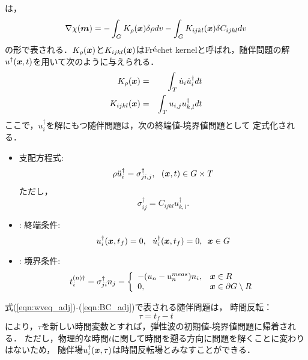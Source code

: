 は，
\begin{equation}
	\nabla \chi(\boldsymbol{m}) = 
	-\int_G K_{\rho}(\boldsymbol{x})\delta \rho dv
	- 
	\int_G K_{ijkl}(\boldsymbol{x}) \delta C_{ijkl} dv
	\label{eqn:}
\end{equation}
の形で表される．$K_\rho(\boldsymbol{x})$と$K_{ijkl}(\boldsymbol{x})$はFr$\acute{\rm e}$chet 
kernelと呼ばれ，随伴問題の解$u^{\dagger}(\boldsymbol{x},t)$を用いて次のように与えられる\cite{Fichtner}．
\begin{eqnarray}
	K_\rho(\boldsymbol{x}) &= & \int _T \dot{u}_i \dot{u}^{\dagger}_i dt 
	\label{eqn:K_rho}
	\\
	K_{ijkl}(\boldsymbol{x}) &= & \int _T u_{i,j} u^{\dagger}_{k,l} dt 
	\label{eqn:K_ijkl}
\end{eqnarray}
ここで，$u_i^{\dagger}$を解にもつ随伴問題は，次の終端値-境界値問題として
定式化される．
\begin{itemize}
\item
支配方程式:
\begin{equation}
	\rho \ddot{u}_i^{\dagger} =
	\sigma^{\dagger}_{ji,j}, \ \ 
	(\fat{x},t) \in G\times T
	\label{eqn:wveq_adj}
\end{equation}
ただし，
\begin{equation}
	\sigma_{ij}^{\dagger}= C_{ijkl}u_{k,l}^{\dagger}.
	\label{eqn:sigma_dgg}
\end{equation}
\item: 
終端条件:
\begin{equation}
	u_i^{\dagger}(\boldsymbol{x},t_f) =0,  \ \
	\dot{u}_i^{\dagger}(\boldsymbol{x},t_f) =0,  \ \, \boldsymbol{x}\in G
	\label{eqn:IC_adj}
\end{equation}
\item:
境界条件:
\begin{equation}
	t_i^{(n)\dagger}
	=
	\sigma_{ji}^{\dagger}n_j =
	\left\{
		\begin{array}{ll}
			-(u_n-u_n^{meas})n_i, & \boldsymbol{x}\in R \\
			0, & \boldsymbol{x} \in \partial G\setminus R
		\end{array}
	\right.
	\label{eqn:BC_adj}
\end{equation}
\end{itemize}
式(\ref{eqn:wveq_adj})-(\ref{eqn:BC_adj})で表される随伴問題は，
時間反転：
\begin{equation}
	\tau=t_f-t
	\label{eqn:tau_def}
\end{equation}
により，$\tau$を新しい時間変数とすれば，弾性波の初期値-境界値問題に帰着される．
ただし，物理的な時間$t$に関して時間を遡る方向に問題を解くことに変わりはないため，
随伴場$u_i^{\dagger}(\boldsymbol{x},\tau)$は時間反転場とみなすことができる．
